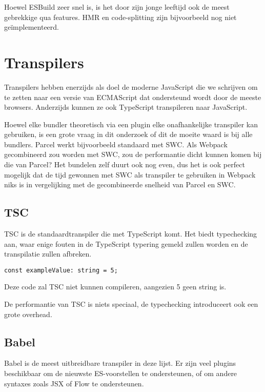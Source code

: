 Hoewel ESBuild zeer snel is, is het door zijn jonge leeftijd ook de meest gebrekkige qua features. HMR en code-splitting zijn bijvoorbeeld nog niet geïmplementeerd. \autocite{wallace}

\section{Transpilers}

Transpilers hebben enerzijds als doel de moderne JavaScript die we schrijven om te zetten naar een versie van ECMAScript dat ondersteund wordt door de meeste browsers. Anderzijds kunnen ze ook TypeScript transpileren naar JavaScript. 

Hoewel elke bundler theoretisch via een plugin elke onafhankelijke transpiler kan gebruiken, is een grote vraag in dit onderzoek of dit de moeite waard is bij alle bundlers. Parcel werkt bijvoorbeeld standaard met SWC. Als Webpack gecombineerd zou worden met SWC, zou de performantie dicht kunnen komen bij die van Parcel? Het bundelen zelf duurt ook nog even, dus het is ook perfect mogelijk dat de tijd gewonnen met SWC als transpiler te gebruiken in Webpack niks is in vergelijking met de gecombineerde snelheid van Parcel en SWC.

\subsection{TSC}

TSC is de standaardtranspiler die met TypeScript komt. Het biedt typechecking aan, waar enige fouten in de TypeScript typering gemeld zullen worden en de transpilatie zullen afbreken.

\begin{lstlisting}
const exampleValue: string = 5;
\end{lstlisting}

Deze code zal TSC niet kunnen compileren, aangezien 5 geen string is.

De performantie van TSC is niets speciaal, de typechecking introduceert ook een grote overhead.

\subsection{Babel}

Babel is de meest uitbreidbare transpiler in deze lijst. Er zijn veel plugins beschikbaar om de nieuwste ES-voorstellen te ondersteunen, of om andere syntaxes zoals JSX of Flow te ondersteunen.

